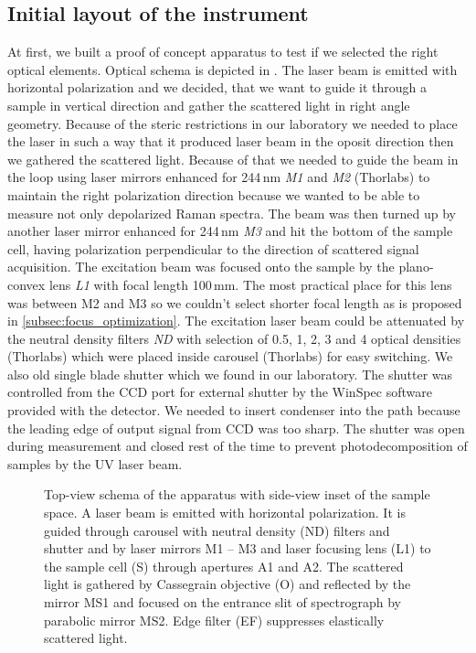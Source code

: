 \subsection{Initial layout of the instrument}

At first, we built a proof of concept apparatus to test if we selected the
right optical elements. Optical schema is depicted in
.
The laser beam is emitted with horizontal polarization and we decided, that we
want to guide it through a sample in vertical direction and gather the
scattered light in right angle geometry. Because of the steric restrictions in
our laboratory we needed to place the laser in such a way that it produced
laser beam in the oposit direction then we gathered the scattered light.
Because of that we needed to guide the beam in the loop using laser mirrors
enhanced for 244\,nm \emph{M1} and \emph{M2} (Thorlabs) to maintain the right
polarization direction because we wanted to be able to measure not only
depolarized Raman spectra. The beam was then turned up by another laser mirror
enhanced for 244\,nm \emph{M3} and hit the bottom of the sample cell, having
polarization perpendicular to the direction of scattered signal acquisition.
The excitation beam was focused onto the sample by the plano-convex lens
\emph{L1} with focal length 100\,mm. The most practical place for this lens
was between M2 and M3 so we couldn't select shorter focal length as is proposed
in \cref{subsec:focus_optimization}. The excitation laser beam could be attenuated by
the neutral density filters \emph{ND} with selection of 0.5, 1, 2, 3 and 4
optical densities (Thorlabs) which were placed inside carousel (Thorlabs) for
easy switching. We also old single blade shutter which we found in our
laboratory. The shutter was controlled from the CCD port for external shutter
by the WinSpec software provided with the detector. We needed to insert
condenser into the path because the leading edge of output signal from CCD was
too sharp. The shutter was open during measurement and closed rest of the time
to prevent photodecomposition of samples by the UV laser beam.

\begin{figure}
	\centering
	
	\caption{Top-view schema of the apparatus with side-view inset of the sample
		space. A laser beam is emitted with horizontal polarization. It is guided
		through carousel with neutral density (ND) filters and shutter and by laser
		mirrors M1 -- M3 and laser focusing lens (L1) to the sample cell (S)
		through apertures A1 and A2. The scattered light is gathered by Cassegrain
		objective (O) and reflected by the mirror MS1 and focused on the entrance
		slit of spectrograph by parabolic mirror MS2. Edge filter (EF) suppresses
		elastically scattered light.}
	\label{\figlabel{initial_layout:apparatus_schema}}
\end{figure}

